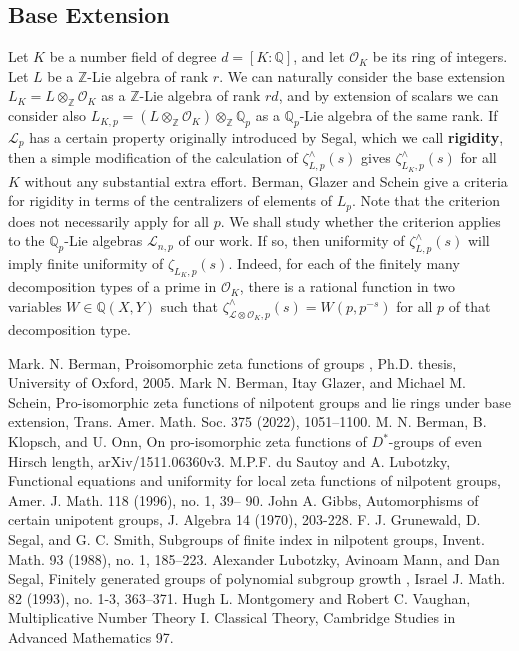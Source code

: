 \documentclass[12pt]{article}
\begin{document}
\subsection{Base Extension}
Let $K$ be a number field of degree $d=[K:\mathbb{Q}]$, and let $\mathcal{O}_K$ be its ring of integers. Let $L$ be a $\mathbb{Z}$-Lie algebra of rank $r$. We can naturally consider the base extension $L_{K}=L\otimes_{\mathbb{Z}}\mathcal{O}_{K}$ as a $\mathbb{Z}$-Lie algebra of rank $rd$, and by extension of scalars we can consider also $L_{K,p}=(L\otimes_{\mathbb{Z}}\mathcal{O}_K)\otimes_{\mathbb{Z}}\mathbb{Q}_p$ as a $\mathbb{Q}_p$-Lie algebra of the same rank. If $\mathcal{L}_{p}$ has a certain property originally introduced by Segal, which we call \textbf{rigidity}, then a simple modification of the calculation of $\zeta_{L,p}^{\wedge}(s)$ gives $\zeta_{L_{K},p}^{\wedge}(s)$ for all $K$ without any substantial extra effort. Berman, Glazer and Schein \cite{BermanGlazerSchein} give a criteria for rigidity in terms of the centralizers of elements of $L_{p}$. Note that the criterion does not necessarily apply for all $p$. We shall study whether the criterion applies to the $\mathbb{Q}_p$-Lie algebras $\mathcal{L}_{n,p}$ of our work. If so, then uniformity of $\zeta_{L,p}^{\wedge}(s)$ will imply finite uniformity of $\zeta_{L_{K},p}(s)$. Indeed, for each of the finitely many decomposition types of a prime in $\mathcal{O}_K$, there is a rational function in two variables $W\in\mathbb{Q}(X,Y)$ such that $\zeta_{\mathcal{L}\otimes\mathcal{O}_K,p}^{\wedge}(s)=W(p,p^{-s})$ for all $p$ of that decomposition type.
\begin{thebibliography}{2}
 Mark. N. Berman,
Proisomorphic zeta functions of groups
, Ph.D. thesis, University of Oxford,
2005.
 Mark N. Berman, Itay Glazer, and Michael M. Schein, Pro-isomorphic zeta functions of nilpotent groups and lie rings under base extension, Trans. Amer. Math. Soc. 375 (2022), 1051–1100.
 M. N. Berman, B. Klopsch, and U. Onn,
On pro-isomorphic zeta functions of $D^{\ast}$-groups of even Hirsch length, arXiv/1511.06360v3.
 M.P.F. du Sautoy and A. Lubotzky, Functional equations and uniformity for
local zeta functions of nilpotent groups, Amer. J. Math. 118 (1996), no. 1, 39–
90.
 John A. Gibbs, Automorphisms of certain unipotent groups, J. Algebra 14 (1970), 203-228.
 F. J. Grunewald, D. Segal, and G. C. Smith, Subgroups of finite index in nilpotent groups,
Invent. Math. 93 (1988), no. 1, 185–223.
 Alexander Lubotzky, Avinoam Mann, and Dan Segal,
Finitely generated groups of polynomial
subgroup growth
, Israel J. Math.
82
(1993), no. 1-3, 363–371.
 Hugh L. Montgomery and Robert C. Vaughan, Multiplicative Number Theory I. Classical Theory, Cambridge Studies in Advanced Mathematics 97.
\end{thebibliography}
\end{document}
